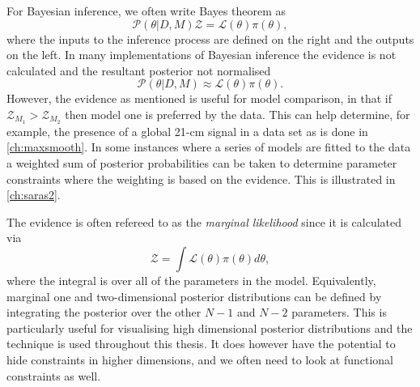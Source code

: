 For Bayesian inference, we often write Bayes theorem as
\begin{equation}
    \mathcal{P}(\theta|D, M) \mathcal{Z} = \mathcal{L}(\theta) \pi(\theta),
\end{equation}
where the inputs to the inference process are defined on the right and the outputs on the left. In many implementations of Bayesian inference the evidence is not calculated and the resultant posterior not normalised
\begin{equation}
    \mathcal{P}(\theta|D, M) \approx \mathcal{L}(\theta) \pi(\theta).
    \label{eq:bayes_proportional}
\end{equation}
However, the evidence as mentioned is useful for model comparison, in that if $\mathcal{Z}_{M_1} > \mathcal{Z}_{M_2}$ then model one is preferred by the data. This can help determine, for example, the presence of a global 21-cm signal in a data set as is done in \cref{ch:maxsmooth}. In some instances where a series of models are fitted to the data a weighted sum of posterior probabilities can be taken to determine parameter constraints where the weighting is based on the evidence. This is illustrated in \cref{ch:saras2}.

The evidence is often refereed to as the \textit{marginal likelihood} since it is calculated via
\begin{equation}
    \mathcal{Z} = \int \mathcal{L}(\theta) \pi(\theta) d\theta,
    \label{eq:evidence_intro}
\end{equation}
where the integral is over all of the parameters in the model. Equivalently, marginal one and two-dimensional posterior distributions can be defined by integrating the posterior over the other $N-1$ and $N-2$ parameters. This is particularly useful for visualising high dimensional posterior distributions and the technique is used throughout this thesis. It does however have the potential to hide constraints in higher dimensions, and we often need to look at functional constraints as well.

